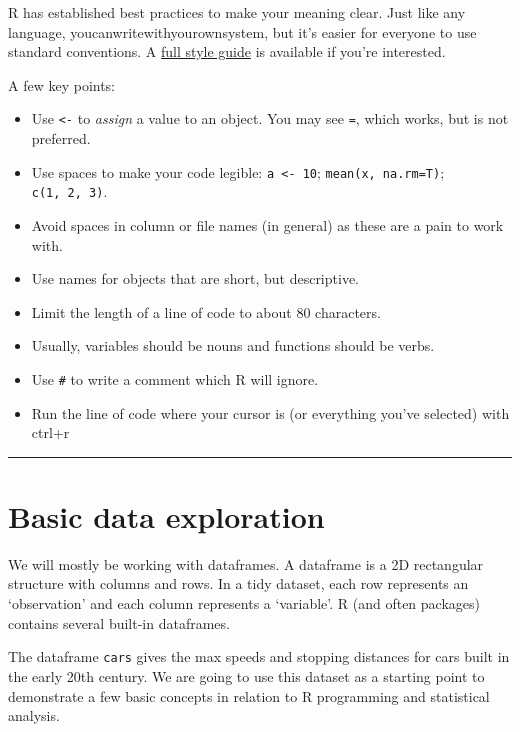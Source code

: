 \documentclass[
  11pt,
  a4paper,
]{book}
\providecommand{\tightlist}{%
  \setlength{\itemsep}{0pt}\setlength{\parskip}{0pt}}
\begin{document}
R has established best practices to make your meaning clear. Just like any language, you\textbar can\textbar write\textbar with\textbar your\textbar own\textbar system, but it's easier for everyone to use standard conventions. A \href{https://style.tidyverse.org/syntax.html}{full style guide} is available if you're interested.

A few key points:

\begin{itemize}
\tightlist
\item
  Use \texttt{\textless{}-} to \emph{assign} a value to an object. You may see \texttt{=}, which works, but is not preferred.
\item
  Use spaces to make your code legible: \texttt{a\ \textless{}-\ 10}; \texttt{mean(x,\ na.rm=T)}; \texttt{c(1,\ 2,\ 3)}.
\item
  Avoid spaces in column or file names (in general) as these are a pain to work with.
\item
  Use names for objects that are short, but descriptive.
\item
  Limit the length of a line of code to about 80 characters.
\item
  Usually, variables should be nouns and functions should be verbs.
\item
  Use \texttt{\#} to write a comment which R will ignore.
\item
  Run the line of code where your cursor is (or everything you've selected) with ctrl+r
\end{itemize}

\begin{center}\rule{0.5\linewidth}{0.5pt}\end{center}

\hypertarget{basic-data-exploration}{%
\section{Basic data exploration}\label{basic-data-exploration}}

We will mostly be working with dataframes. A dataframe is a 2D rectangular structure with columns and rows. In a tidy dataset, each row represents an `observation' and each column represents a `variable'. R (and often packages) contains several built-in dataframes.

The dataframe \texttt{cars} gives the max speeds and stopping distances for cars built in the early 20th century. We are going to use this dataset as a starting point to demonstrate a few basic concepts in relation to R programming and statistical analysis.
\end{document}

